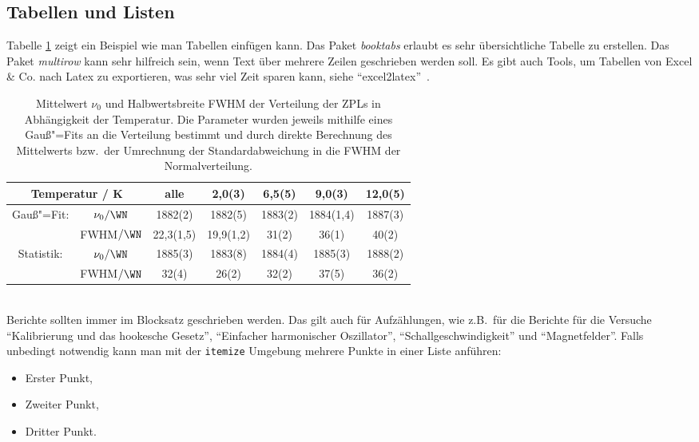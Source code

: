 \subsection{Tabellen und Listen}
\label{subsec:Tabellen}

Tabelle \ref{tab:TempabhVerteilung} zeigt ein Beispiel wie man Tabellen einfügen kann. Das Paket \textit{booktabs} erlaubt es sehr übersichtliche Tabelle zu erstellen. Das Paket \textit{multirow} kann sehr hilfreich sein, wenn Text über mehrere Zeilen geschrieben werden soll. Es gibt auch Tools, um Tabellen von Excel \& Co. nach Latex zu exportieren, was sehr viel Zeit sparen kann, siehe "`excel2latex"'~\cite{extolat}.
\begin{table}[htbp]
\centering
\caption{\label{tab:TempabhVerteilung}Mittelwert $\nu_0$ und Halbwertsbreite FWHM der Verteilung der ZPLs in Abhängigkeit der Temperatur. Die Parameter wurden jeweils mithilfe eines Gauß"=Fits an die Verteilung bestimmt und durch direkte Berechnung des Mittelwerts bzw.\ der Umrechnung der Standardabweichung in die FWHM der Normalverteilung.}
\begin{tabular}{ccccccc}
\toprule
\multicolumn{2}{c}{Temperatur / \si{\kelvin}}	& \multicolumn{1}{c}{alle}		& 2,0(3)		& 6,5(5)		& 9,0(3) & 12,0(5) \\
\midrule
\multirow{2}{*}{Gauß"=Fit:} & \multicolumn{1}{c}{$\nu_0/\si{\WN}$}	& 1882(2)		& 1882(5)		& 1883(2) & 1884(1,4) & 1887(3) \\
														&	\multicolumn{1}{c}{FWHM$/\si{\WN}$}		& 22,3(1,5)			& 19,9(1,2)			& 31(2) 	& 36(1) 	& 40(2) \\
\midrule
\multirow{2}{*}{Statistik:} & \multicolumn{1}{c}{$\nu_0/\si{\WN}$}	& 1885(3)		& 1883(8)		& 1884(4) & 1885(3) & 1888(2) \\
														& \multicolumn{1}{c}{FWHM$/\si{\WN}$}		& 32(4)			& 26(2)			& 32(2) 	& 37(5) 	& 36(2) \\
\bottomrule
\end{tabular}
\end{table}\\
Berichte sollten immer im Blocksatz geschrieben werden. Das gilt auch für Aufzählungen, wie z.B.\ für die Berichte für die Versuche "`Kalibrierung und das hookesche Gesetz"', "`Einfacher harmonischer Oszillator"', "`Schallgeschwindigkeit"' und "`Magnetfelder"'. Falls unbedingt notwendig kann man mit der \verb"itemize" Umgebung mehrere Punkte in einer Liste anführen:
\begin{itemize}
    \item Erster Punkt,
    \item Zweiter Punkt,
    \item Dritter Punkt.
\end{itemize}



